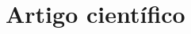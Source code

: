 \documentclass{ufscThesis}
\begin{document}



% 

%
%


\anexo
\chapter{Artigo científico}


%
\end{document}
